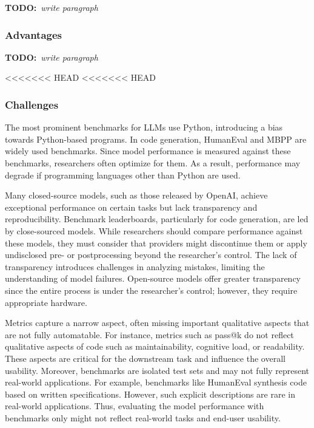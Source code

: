 \documentclass[11pt]{article}
\newcommand{\todo}[1]{{\textbf{TODO:}\ \textit{#1}}} %
\begin{document}
\todo{write paragraph}


\subsubsection{Advantages}

\todo{write paragraph}

<<<<<<< HEAD
<<<<<<< HEAD

\subsubsection{Challenges}

The most prominent benchmarks for LLMs use Python, introducing a bias towards Python-based programs.
In code generation, HumanEval and MBPP are widely used benchmarks.
Since model performance is measured against these benchmarks, researchers often optimize for them.
As a result, performance may degrade if programming languages other than Python are used.

Many closed-source models, such as those released by OpenAI, achieve exceptional performance on certain tasks but lack transparency and reproducibility.
Benchmark leaderboards, particularly for code generation, are led by close-sourced models.
While researchers should compare performance against these models, they must consider that providers might discontinue them or apply undisclosed pre- or postprocessing beyond the researcher's control.
The lack of transparency introduces challenges in analyzing mistakes, limiting the understanding of model failures.
Open-source models offer greater transparency since the entire process is under the researcher's control; however, they require appropriate hardware.

Metrics capture a narrow aspect, often missing important qualitative aspects that are not fully automatable.
For instance, metrics such as pass@k do not reflect qualitative aspects of code such as maintainability, cognitive load, or readability.
These aspects are critical for the downstream task and influence the overall usability.
Moreover, benchmarks are isolated test sets and may not fully represent real-world applications.
For example, benchmarks like HumanEval synthesis code based on written specifications.
However, such explicit descriptions are rare in real-world applications.
Thus, evaluating the model performance with benchmarks only might not reflect real-world tasks and end-user usability.
\end{document}
